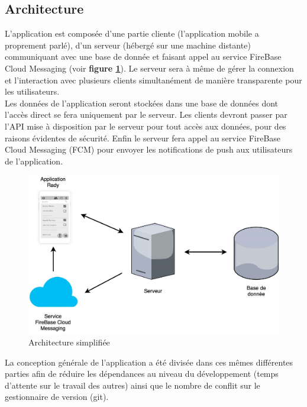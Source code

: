 \documentclass[french]{article}
\begin{document}
		\subsection{Architecture}
		L’application est composée d’une partie cliente (l'application mobile a proprement parlé), d’un serveur (hébergé sur une machine distante) communiquant avec une base de donnée et faisant appel au service FireBase Cloud Messaging (voir \textbf{figure \ref{Architecture simplifié}}). Le serveur sera à même de gérer la connexion et l’interaction avec plusieurs clients simultanément de manière transparente pour les utilisateurs. \\
		Les données de l’application seront stockées dans une base de données dont l’accès direct se fera uniquement par le serveur. Les clients devront passer par l'API mise à disposition par le serveur pour tout accès aux données, pour des raisons évidentes de sécurité.
		Enfin le serveur fera appel au service FireBase Cloud Messaging (FCM) pour envoyer les notifications de push aux utilisateurs de l'application. 
		
		\begin{figure}[H]
			\centering
			\includegraphics[scale=0.20]{../schema/schema-simplifie.jpg}
			\caption{Architecture simplifiée}
			\label{Architecture simplifié}
		\end{figure}
		
		La conception générale de l'application a été divisée dans ces mêmes différentes parties afin de réduire les dépendances au niveau du développement (temps d'attente sur le travail des autres) ainsi que le nombre de conflit sur le gestionnaire de version (git).
		
\end{document}
